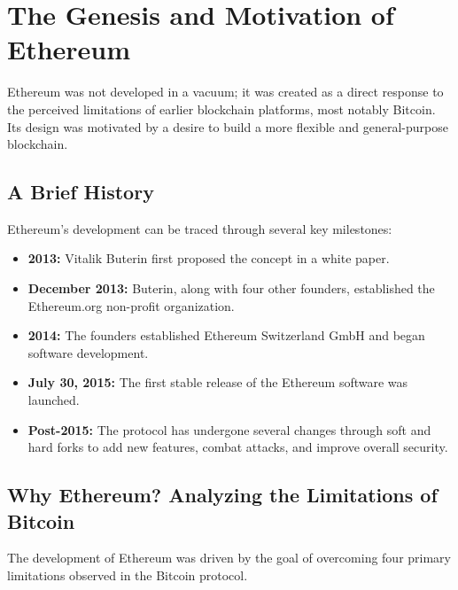 \documentclass{scrbook}
\begin{document}
\chapter{The Genesis and Motivation of Ethereum}

Ethereum was not developed in a vacuum; it was created as a direct response to the perceived limitations of earlier blockchain platforms, most notably Bitcoin. Its design was motivated by a desire to build a more flexible and general-purpose blockchain.

\section{A Brief History}

Ethereum's development can be traced through several key milestones:

\begin{itemize}
    \item \textbf{2013:} Vitalik Buterin first proposed the concept in a white paper.
    \item \textbf{December 2013:} Buterin, along with four other founders, established the Ethereum.org non-profit organization.
    \item \textbf{2014:} The founders established Ethereum Switzerland GmbH and began software development.
    \item \textbf{July 30, 2015:} The first stable release of the Ethereum software was launched.
    \item \textbf{Post-2015:} The protocol has undergone several changes through soft and hard forks to add new features, combat attacks, and improve overall security.
\end{itemize}

\section{Why Ethereum? Analyzing the Limitations of Bitcoin}

The development of Ethereum was driven by the goal of overcoming four primary limitations observed in the Bitcoin protocol.
\end{document}
